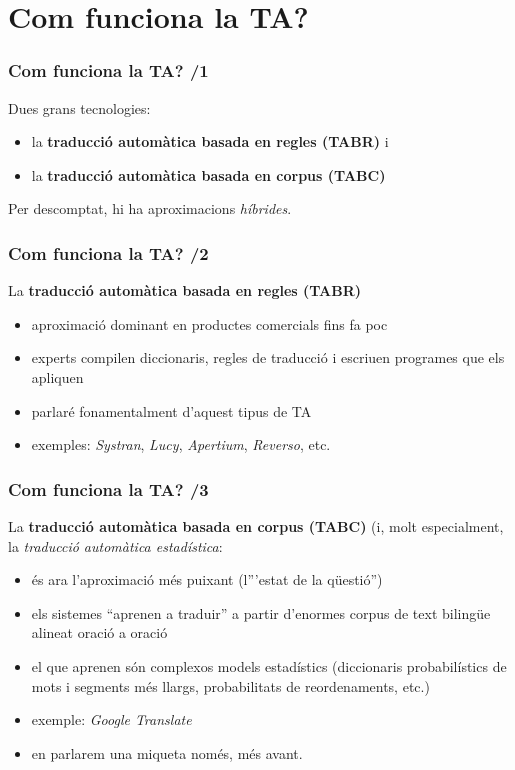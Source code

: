 \documentclass{beamer}
\newcommand{\empha}[1]{\emph{#1}\/}
\begin{document}
\section{Com funciona la TA?}

\begin{frame}
  \frametitle{Com funciona la TA? /1}
Dues grans tecnologies: 
\begin{itemize}
\item la \textbf{traducció automàtica basada en regles (TABR)} i
\item la \textbf{traducció automàtica basada en corpus (TABC)} 
\end{itemize}
Per descomptat, hi ha aproximacions \empha{híbrides}.
\end{frame}

\begin{frame}
  \frametitle{Com funciona la TA? /2}

La \textbf{traducció automàtica basada en regles (TABR)}
  \begin{itemize}
  \item aproximació dominant en productes comercials fins fa poc
  \item experts compilen diccionaris, regles de traducció i escriuen programes que els apliquen
  \item parlaré fonamentalment d'aquest tipus de TA
  \item exemples: \empha{Systran}, \empha{Lucy}, \empha{Apertium}, \empha{Reverso}, etc.
  \end{itemize}
\end{frame}


\begin{frame}
  \frametitle{Com funciona la TA? /3}
La \textbf{traducció automàtica basada en corpus (TABC)} (i, molt especialment, la \empha{traducció automàtica estadística}:
  \begin{itemize}
  \item és ara l'aproximació més puixant (l'''estat de la qüestió'')
  \item els sistemes ``aprenen a traduir'' a partir d'enormes corpus de text bilingüe alineat oració a oració
  \item el que aprenen són complexos models estadístics (diccionaris probabilístics de mots i segments més llargs, probabilitats de reordenaments, etc.)
  \item exemple: \empha{Google Translate}
  \item en parlarem una miqueta només, més avant.
  \end{itemize}
\end{frame}
\end{document}
